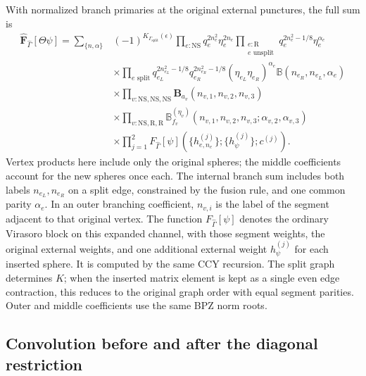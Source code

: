 \documentclass[11pt]{article}
\newcommand{\NS}{\mathrm{NS}}
\newcommand{\R}{\mathrm R}
\numberwithin{equation}{section}
\begin{document}
With normalized branch primaries at the original external punctures,
the full sum is
\begin{align}
 \widehat{\mathbf F}_{\hat\Gamma}[\Theta\psi]
 =\sum_{\{n,\alpha\}}{}&(-1)^{K_{\Gamma_{\mathrm{split}}}(\epsilon)}
 \prod_{e:\NS}q_e^{2n_e^2}\eta_e^{2n_e}
 \prod_{\substack{e:\R\\e\text{ unsplit}}}
                       q_e^{2n_e^2-1/8}\eta_e^{\alpha_e}
 \nonumber\\
 &\times\prod_{e\text{ split}}
       q_{e_L}^{2n_{e_L}^2-1/8}q_{e_R}^{2n_{e_R}^2-1/8}
       (\eta_{e_L}\eta_{e_R})^{\alpha_e}
       \mathbb B(n_{e_R},n_{e_L},\alpha_e)
 \nonumber\\
 &\times\prod_{v:\NS,\NS,\NS}
               \mathbf B_{a_v}(n_{v,1},n_{v,2},n_{v,3})
 \nonumber\\
 &\times\prod_{v:\NS,\R,\R}
               \mathbb B_{f_v}^{(\eta_v)}
                  (n_{v,1},n_{v,2},n_{v,3};\alpha_{v,2},\alpha_{v,3})
 \nonumber\\
 &\times\prod_{j=1}^2F_{\hat\Gamma}[\psi]
                   (\{h_{e,n_e}^{(j)}\};\{h_\psi^{(j)}\};c^{(j)}).
 \label{eq:split-double-virasoro}
\end{align}
Vertex products here include only the original spheres; the middle
coefficients account for the new spheres once each. The internal branch
sum includes both labels $n_{e_L},n_{e_R}$ on a split edge, constrained
by the fusion rule, and one common parity $\alpha_e$. In an outer
branching coefficient, $n_{v,i}$ is the label of the segment adjacent to
that original vertex. The function $F_{\hat\Gamma}[\psi]$ denotes the
ordinary Virasoro block on this expanded channel, with those segment
weights, the original external weights, and one additional external weight
$h_\psi^{(j)}$ for each inserted sphere. It is computed by the same CCY
recursion. The split graph determines $K$; when the inserted matrix
element is kept as a single even edge contraction, this reduces to
the original graph order with equal segment parities. Outer and
middle coefficients use the same BPZ norm roots.

\subsection{Convolution before and after the diagonal restriction}
\end{document}
